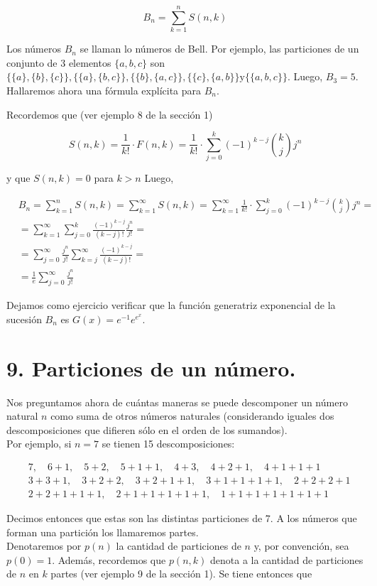 \documentclass[10pt]{article}
\begin{document}
$$
B_{n}=\sum_{k=1}^{n} S(n, k)
$$

Los números $B_{n}$ se llaman lo números de Bell. Por ejemplo, las particiones de un conjunto de 3 elementos $\{a, b, c\}$ son $\{\{a\},\{b\},\{c\}\},\{\{a\},\{b, c\}\},\{\{b\},\{a, c\}\},\{\{c\},\{a, b\}\} \mathrm{y} \{\{a, b, c\}\}$. Luego, $B_{3}=5$. Hallaremos ahora una fórmula explícita para $B_{n}$.

Recordemos que (ver ejemplo 8 de la sección 1)

$$
S(n, k)=\frac{1}{k!} \cdot F(n, k)=\frac{1}{k!} \cdot \sum_{j=0}^{k}(-1)^{k-j}\binom{k}{j} j^{n}
$$

y que $S(n, k)=0$ para $k>n$ Luego,

$$
\begin{aligned}
& B_{n}=\sum_{k=1}^{n} S(n, k)=\sum_{k=1}^{\infty} S(n, k)=\sum_{k=1}^{\infty} \frac{1}{k!} \cdot \sum_{j=0}^{k}(-1)^{k-j}\binom{k}{j} j^{n}= \\
& =\sum_{k=1}^{\infty} \sum_{j=0}^{k} \frac{(-1)^{k-j}}{(k-j)!} \frac{j^{n}}{j!}= \\
& =\sum_{j=0}^{\infty} \frac{j^{n}}{j!} \sum_{k=j}^{\infty} \frac{(-1)^{k-j}}{(k-j)!}= \\
& =\frac{1}{e} \sum_{j=0}^{\infty} \frac{j^{n}}{j!}
\end{aligned}
$$

Dejamos como ejercicio verificar que la función generatriz exponencial de la sucesión $B_{n}$ es $G(x)=e^{-1} e^{e^{x}}$.

\section*{9. Particiones de un número.}
Nos preguntamos ahora de cuántas maneras se puede descomponer un número natural $n$ como suma de otros números naturales (considerando iguales dos descomposiciones que difieren sólo en el orden de los sumandos).\\
Por ejemplo, si $n=7$ se tienen 15 descomposiciones:

$$
\begin{aligned}
& 7, \quad 6+1, \quad 5+2, \quad 5+1+1, \quad 4+3, \quad 4+2+1, \quad 4+1+1+1 \\
& 3+3+1, \quad 3+2+2, \quad 3+2+1+1, \quad 3+1+1+1+1, \quad 2+2+2+1 \\
& 2+2+1+1+1, \quad 2+1+1+1+1+1, \quad 1+1+1+1+1+1+1
\end{aligned}
$$

Decimos entonces que estas son las distintas particiones de 7. A los números que forman una partición los llamaremos partes.\\
Denotaremos por $p(n)$ la cantidad de particiones de $n$ y, por convención, sea $p(0)=1$. Además, recordemos que $p(n, k)$ denota a la cantidad de particiones de $n$ en $k$ partes (ver ejemplo 9 de la sección 1). Se tiene entonces que
\end{document}

